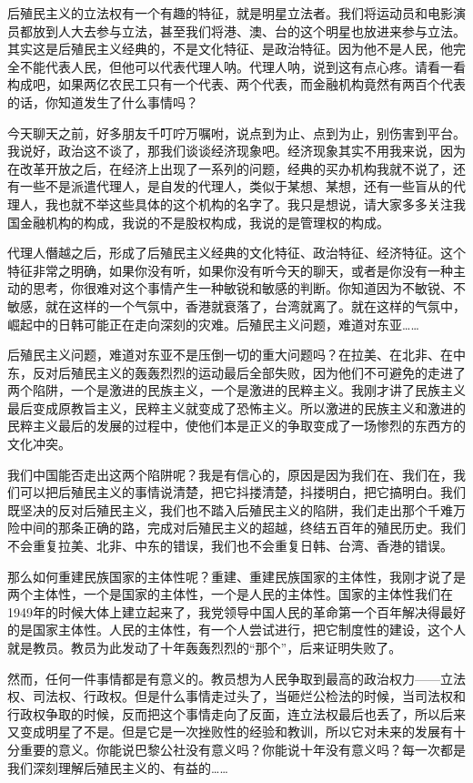 \documentclass[UTF8, 12pt, a4paper]{ctexrep}
\begin{document}
后殖民主义的立法权有一个有趣的特征，就是明星立法者。我们将运动员和电影演员都放到人大去参与立法，甚至我们将港、澳、台的这个明星也放进来参与立法。其实这是后殖民主义经典的，不是文化特征、是政治特征。因为他不是人民，他完全不能代表人民，但他可以代表代理人呐。代理人呐，说到这有点心疼。请看一看构成吧，如果两亿农民工只有一个代表、两个代表，而金融机构竟然有两百个代表的话，你知道发生了什么事情吗？

今天聊天之前，好多朋友千叮咛万嘱咐，说点到为止、点到为止，别伤害到平台。我说好，政治这不谈了，那我们谈谈经济现象吧。经济现象其实不用我来说，因为在改革开放之后，在经济上出现了一系列的问题，经典的买办机构我就不说了，还有一些不是派遣代理人，是自发的代理人，类似于某想、某想，还有一些盲从的代理人，我也就不举这些具体的这个机构的名字了。我只是想说，请大家多多关注我国金融机构的构成，我说的不是股权构成，我说的是管理权的构成。

代理人僭越之后，形成了后殖民主义经典的文化特征、政治特征、经济特征。这个特征非常之明确，如果你没有听，如果你没有听今天的聊天，或者是你没有一种主动的思考，你很难对这个事情产生一种敏锐和敏感的判断。你知道因为不敏锐、不敏感，就在这样的一个气氛中，香港就衰落了，台湾就离了。就在这样的气氛中，崛起中的日韩可能正在走向深刻的灾难。后殖民主义问题，难道对东亚……

后殖民主义问题，难道对东亚不是压倒一切的重大问题吗？在拉美、在北非、在中东，反对后殖民主义的轰轰烈烈的运动最后全部失败，因为他们不可避免的走进了两个陷阱，一个是激进的民族主义，一个是激进的民粹主义。我刚才讲了民族主义最后变成原教旨主义，民粹主义就变成了恐怖主义。所以激进的民族主义和激进的民粹主义最后的发展的过程中，使他们本是正义的争取变成了一场惨烈的东西方的文化冲突。

我们中国能否走出这两个陷阱呢？我是有信心的，原因是因为我们在、我们在，我们可以把后殖民主义的事情说清楚，把它抖搂清楚，抖搂明白，把它搞明白。我们既坚决的反对后殖民主义，我们也不踏入后殖民主义的陷阱，我们走出那个千难万险中间的那条正确的路，完成对后殖民主义的超越，终结五百年的殖民历史。我们不会重复拉美、北非、中东的错误，我们也不会重复日韩、台湾、香港的错误。

那么如何重建民族国家的主体性呢？重建、重建民族国家的主体性，我刚才说了是两个主体性，一个是国家的主体性，一个是人民的主体性。国家的主体性我们在1949年的时候大体上建立起来了，我党领导中国人民的革命第一个百年解决得最好的是国家主体性。人民的主体性，有一个人尝试进行，把它制度性的建设，这个人就是教员。教员为此发动了十年轰轰烈烈的“那个”，后来证明失败了。

然而，任何一件事情都是有意义的。教员想为人民争取到最高的政治权力——立法权、司法权、行政权。但是什么事情走过头了，当砸烂公检法的时候，当司法权和行政权争取的时候，反而把这个事情走向了反面，连立法权最后也丢了，所以后来又变成明星了不是。但是它是一次挫败性的经验和教训，所以它对未来的发展有十分重要的意义。你能说巴黎公社没有意义吗？你能说十年没有意义吗？每一次都是我们深刻理解后殖民主义的、有益的……
\end{document}
